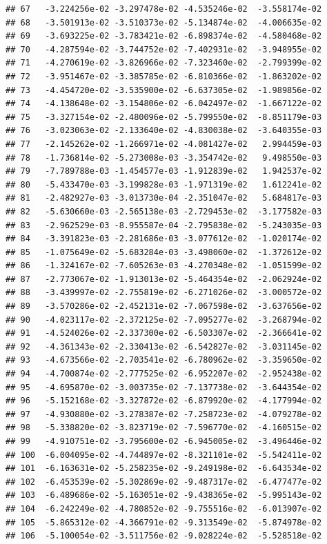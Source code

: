 \documentclass[
]{article}
\begin{document}
\begin{verbatim}
## 67   -3.224256e-02 -3.297478e-02 -4.535246e-02  -3.558174e-02
## 68   -3.501913e-02 -3.510373e-02 -5.134874e-02  -4.006635e-02
## 69   -3.693225e-02 -3.783421e-02 -6.898374e-02  -4.580468e-02
## 70   -4.287594e-02 -3.744752e-02 -7.402931e-02  -3.948955e-02
## 71   -4.270619e-02 -3.826966e-02 -7.323460e-02  -2.799399e-02
## 72   -3.951467e-02 -3.385785e-02 -6.810366e-02  -1.863202e-02
## 73   -4.454720e-02 -3.535900e-02 -6.637305e-02  -1.989856e-02
## 74   -4.138648e-02 -3.154806e-02 -6.042497e-02  -1.667122e-02
## 75   -3.327154e-02 -2.480096e-02 -5.799550e-02  -8.851179e-03
## 76   -3.023063e-02 -2.133640e-02 -4.830038e-02  -3.640355e-03
## 77   -2.145262e-02 -1.266971e-02 -4.081427e-02   2.994459e-03
## 78   -1.736814e-02 -5.273008e-03 -3.354742e-02   9.498550e-03
## 79   -7.789788e-03 -1.454577e-03 -1.912839e-02   1.942537e-02
## 80   -5.433470e-03 -3.199828e-03 -1.971319e-02   1.612241e-02
## 81   -2.482927e-03 -3.013730e-04 -2.351047e-02   5.684817e-03
## 82   -5.630660e-03 -2.565138e-03 -2.729453e-02  -3.177582e-03
## 83   -2.962529e-03 -8.955587e-04 -2.795838e-02  -5.243035e-03
## 84   -3.391823e-03 -2.281686e-03 -3.077612e-02  -1.020174e-02
## 85   -1.075649e-02 -5.683284e-03 -3.498060e-02  -1.372612e-02
## 86   -1.324167e-02 -7.605263e-03 -4.270348e-02  -1.051599e-02
## 87   -2.773067e-02 -1.913013e-02 -5.464354e-02  -2.062924e-02
## 88   -3.439997e-02 -2.755819e-02 -6.271026e-02  -3.000572e-02
## 89   -3.570286e-02 -2.452131e-02 -7.067598e-02  -3.637656e-02
## 90   -4.023117e-02 -2.372125e-02 -7.095277e-02  -3.268794e-02
## 91   -4.524026e-02 -2.337300e-02 -6.503307e-02  -2.366641e-02
## 92   -4.361343e-02 -2.330413e-02 -6.542827e-02  -3.031145e-02
## 93   -4.673566e-02 -2.703541e-02 -6.780962e-02  -3.359650e-02
## 94   -4.700874e-02 -2.777525e-02 -6.952207e-02  -2.952438e-02
## 95   -4.695870e-02 -3.003735e-02 -7.137738e-02  -3.644354e-02
## 96   -5.152168e-02 -3.327872e-02 -6.879920e-02  -4.177994e-02
## 97   -4.930880e-02 -3.278387e-02 -7.258723e-02  -4.079278e-02
## 98   -5.338820e-02 -3.823719e-02 -7.596770e-02  -4.160515e-02
## 99   -4.910751e-02 -3.795600e-02 -6.945005e-02  -3.496446e-02
## 100  -6.004095e-02 -4.744897e-02 -8.321101e-02  -5.542411e-02
## 101  -6.163631e-02 -5.258235e-02 -9.249198e-02  -6.643534e-02
## 102  -6.453539e-02 -5.302869e-02 -9.487317e-02  -6.477477e-02
## 103  -6.489686e-02 -5.163051e-02 -9.438365e-02  -5.995143e-02
## 104  -6.242249e-02 -4.780852e-02 -9.755516e-02  -6.013907e-02
## 105  -5.865312e-02 -4.366791e-02 -9.313549e-02  -5.874978e-02
## 106  -5.100054e-02 -3.511756e-02 -9.028224e-02  -5.528518e-02

\end{verbatim}
\end{document}
